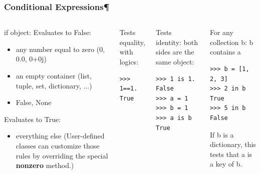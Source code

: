 \documentclass[colorlinks]{beamer}
\begin{document}
\begin{frame}[fragile]\frametitle{Conditional Expressions¶}
\begin{columns}[c]
\tiny
\begin{block}{if object:}
Evaluates to False:
\begin{itemize}
    \item any number equal to zero (0, 0.0, 0+0j)
\item an empty container (list, tuple, set, dictionary, ...)
\item False, None
\end{itemize}  
Evaluates to True:
\begin{itemize}
    \item everything else (User-defined classes can customize those rules by overriding the special \textbf{nonzero} method.)
\end{itemize}
\end{block}

\begin{block}{Tests equality, with logics:}
\begin{verbatim}
>>> 1==1.
True
\end{verbatim}

\end{block}


\tiny
\begin{block}{Tests identity: both sides are the same object:}
\begin{verbatim}
>>> 1 is 1.
False
>>> a = 1
>>> b = 1
>>> a is b
True
\end{verbatim}

\end{block}
\begin{block}{For any collection b: b contains a}
\begin{verbatim}
>>> b = [1, 2, 3]
>>> 2 in b
True
>>> 5 in b
False
\end{verbatim}

If b is a dictionary, this tests that a is a key of b.
\end{block}

\end{columns}
\end{frame}
\end{document}
